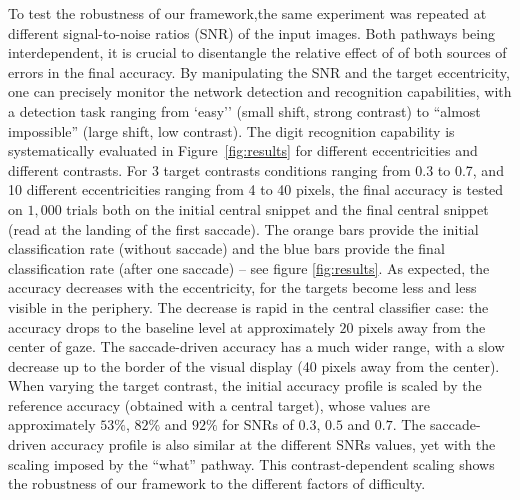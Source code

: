 To test the robustness of our framework,the same experiment was repeated at different signal-to-noise ratios (SNR) of the input images. Both pathways being interdependent, it is crucial to disentangle the relative effect of of both sources of errors in the final accuracy. By manipulating the SNR and the target eccentricity, one can precisely monitor the network detection and recognition capabilities, with a detection task ranging from `easy'' (small shift, strong contrast) to ``almost impossible'' (large shift, low contrast). The  digit recognition capability is systematically evaluated in Figure~\ref{fig:results} for different eccentricities and different contrasts. 
For 3 target contrasts conditions ranging from 0.3 to 0.7, and 10 different eccentricities ranging from 4 to 40 pixels, the final accuracy is tested on $1,000$ trials both on the initial central snippet and the final central snippet (read at the landing of the first saccade). 
The orange bars provide the initial classification rate (without saccade) and the blue bars provide the final classification rate (after one saccade) -- see figure \ref{fig:results}.  As expected, the accuracy decreases with the eccentricity, for the targets become less and less visible in the periphery. The decrease is rapid in the central classifier case: the accuracy drops to the baseline level
at approximately $20$ pixels away from the center of gaze. The saccade-driven accuracy has a much wider range, with a slow decrease up to the border of the visual display (40 pixels away from the center). 
When varying the target contrast, the initial accuracy profile is scaled by the reference accuracy (obtained with a central target), whose values are approximately $53\%$, $82\%$ and $92\%$ for SNRs of $0.3$, $0.5$ and $0.7$. The saccade-driven accuracy profile is also similar at the different SNRs values, yet with the scaling imposed by the ``what'' pathway. This contrast-dependent scaling shows the robustness of our framework to the different factors of difficulty.

